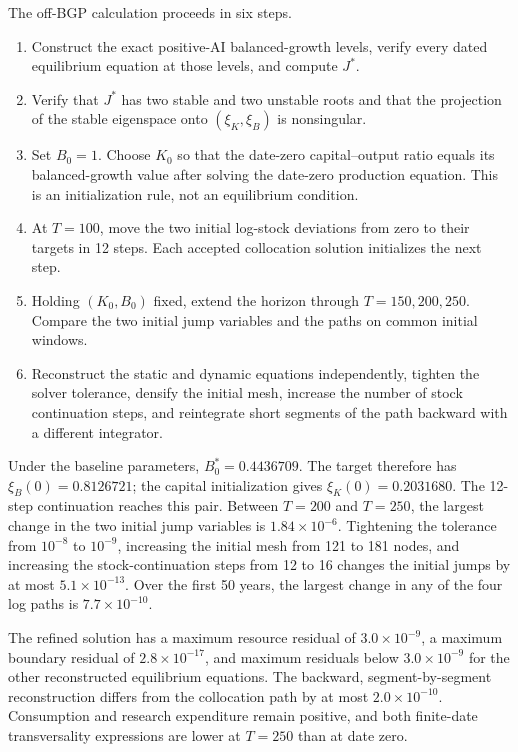 The off-BGP calculation proceeds in six steps.
\begin{enumerate}[label=\textbf{Step \arabic*.},leftmargin=4.5em,labelsep=0.6em]
 \item Construct the exact positive-AI balanced-growth levels, verify every
 dated equilibrium equation at those levels, and compute \(J^*\).
 \item Verify that \(J^*\) has two stable and two unstable roots and that the
 projection of the stable eigenspace onto \((\xi_K,\xi_B)\) is nonsingular.
 \item Set \(B_0=1\). Choose \(K_0\) so that the date-zero capital--output ratio
 equals its balanced-growth value after solving the date-zero production
 equation. This is an initialization rule, not an equilibrium condition.
 \item At \(T=100\), move the two initial log-stock deviations from zero to
 their targets in 12 steps. Each accepted collocation solution initializes the
 next step.
 \item Holding \((K_0,B_0)\) fixed, extend the horizon through
 \(T=150,200,250\). Compare the two initial jump variables and the paths on
 common initial windows.
 \item Reconstruct the static and dynamic equations independently, tighten the
 solver tolerance, densify the initial mesh, increase the number of stock
 continuation steps, and reintegrate short segments of the path backward with
 a different integrator.
\end{enumerate}

Under the baseline parameters, \(B_0^*=0.4436709\). The target therefore has
\(\xi_B(0)=0.8126721\); the capital initialization gives
\(\xi_K(0)=0.2031680\). The 12-step continuation reaches this pair. Between
\(T=200\) and \(T=250\), the largest change in the two initial jump variables
is \(1.84\times10^{-6}\). Tightening the tolerance from \(10^{-8}\) to
\(10^{-9}\), increasing the initial mesh from 121 to 181 nodes, and increasing
the stock-continuation steps from 12 to 16 changes the initial jumps by at most
\(5.1\times10^{-13}\). Over the first 50 years, the largest change in any of
the four log paths is \(7.7\times10^{-10}\).

The refined solution has a maximum resource residual of
\(3.0\times10^{-9}\), a maximum boundary residual of
\(2.8\times10^{-17}\), and maximum residuals below
\(3.0\times10^{-9}\) for the other reconstructed equilibrium equations. The
backward, segment-by-segment reconstruction differs from the collocation path
by at most \(2.0\times10^{-10}\). Consumption and research expenditure remain
positive, and both finite-date transversality expressions are lower at
\(T=250\) than at date zero.

